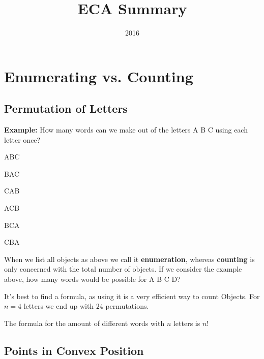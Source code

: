 \documentclass[12pt]{scrartcl}
\title{ECA Summary}
\date{2016}
\begin{document}


\pagestyle{eca-style}

\section{Enumerating vs. Counting}

\subsection{Permutation of Letters}

{\bf Example:} How many words can we make out of the letters A B C using each letter once?

\begin{center}
\begin{inparaitem}
\item ABC \qquad
\item BAC \qquad
\item CAB
\end{inparaitem}

\begin{inparaitem}
\item ACB \qquad
\item BCA \qquad
\item CBA
\end{inparaitem}
\end{center}

When we list all objects as above we call it {\bf enumeration}, whereas {\bf counting} is only concerned with the total number of objects. If we consider the example above, how many words would be possible for A B C D?

It's best to find a formula, as using it is a very efficient way to count Objects. For $n = 4$ letters we end up with $24$ permutations.

The formula for the amount of different words with $n$ letters is $n!$

\subsection{Points in Convex Position}
\end{document}
